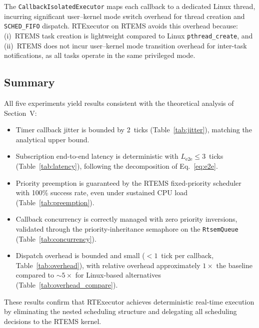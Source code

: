 The \texttt{CallbackIsolatedExecutor} maps each callback to a dedicated Linux thread, incurring significant user--kernel mode switch overhead for thread creation and \texttt{SCHED\_FIFO} dispatch.
RTExecutor on RTEMS avoids this overhead because: (i)~RTEMS task creation is lightweight compared to Linux \texttt{pthread\_create}, and (ii)~RTEMS does not incur user--kernel mode transition overhead for inter-task notifications, as all tasks operate in the same privileged mode.

\subsection{Summary}

All five experiments yield results consistent with the theoretical analysis of Section~V:
\begin{itemize}
    \item Timer callback jitter is bounded by 2~ticks (Table~\ref{tab:jitter}), matching the analytical upper bound.
    \item Subscription end-to-end latency is deterministic with $L_{\mathrm{e2e}} \leqslant 3$~ticks (Table~\ref{tab:latency}), following the decomposition of Eq.~\eqref{eq:e2e}.
    \item Priority preemption is guaranteed by the RTEMS fixed-priority scheduler with 100\% success rate, even under sustained CPU load (Table~\ref{tab:preemption}).
    \item Callback concurrency is correctly managed with zero priority inversions, validated through the priority-inheritance semaphore on the \texttt{RtsemQueue} (Table~\ref{tab:concurrency}).
    \item Dispatch overhead is bounded and small ($< 1$~tick per callback, Table~\ref{tab:overhead}), with relative overhead approximately $1\times$ the baseline compared to $\sim 5\times$ for Linux-based alternatives (Table~\ref{tab:overhead_compare}).
\end{itemize}
These results confirm that RTExecutor achieves deterministic real-time execution by eliminating the nested scheduling structure and delegating all scheduling decisions to the RTEMS kernel.
